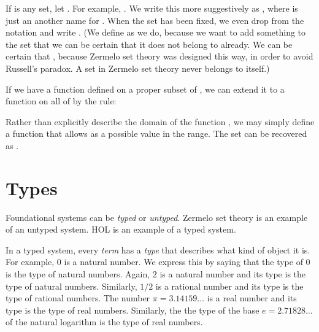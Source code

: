 \documentclass[cup9a]{cupbook}
\begin{document}
If  is any set, let .  For example,
.  We write this more suggestively
as , where  is just an
another name for .  When the set  has been fixed, we even drop
 from the notation and write .
(We define  as we do, because we want to add something to the set 
that we can be certain that it does not belong to  already.  We can
be certain that , because Zermelo set theory was designed this
way, in order to avoid Russell's paradox.  A set in Zermelo set theory
never belongs to itself.)

If we have a function  defined on a proper subset  of , we can
extend it to a function  on all of  by the rule:

Rather than explicitly describe the domain of the function , we may simply
define a function  that allows  as a possible value in the range.  The set  can be recovered as
.








\chapter{Types}

Foundational systems can be {\it typed} or {\it untyped}.  Zermelo set
theory is an example of an untyped system.  HOL is an example of a typed
system.

In a typed system, every  {\it term} has a {\it type} that describes
what kind of object it is.   For example, $0$ is a natural number.  We express this by saying that the type of $0$ is the type of natural numbers.  Again, $2$ is a natural number and its type is the type of natural numbers.  Similarly, $1/2$ is a rational number and its type is the type of rational numbers.  The number $\pi = 3.14159\ldots$ is a real number and its type is the type of real numbers.  Similarly, the the type of the base $e=2.71828\ldots$ of the natural logarithm is the type of real numbers.
\end{document}
